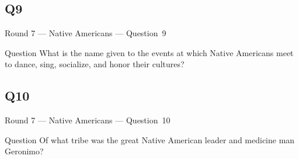 \documentclass[11pt]{beamer}
\begin{document}
\subsection*{Q9}
\begin{frame}[t]{Round 7 --- Native Americans --- \mbox{Question 9}}
\vspace{-0.5em}
\begin{block}{Question}
What is the name given to the events at which Native Americans meet to dance, sing, socialize, and honor their cultures?
\end{block}
\end{frame}
\subsection*{Q10}
\begin{frame}[t]{Round 7 --- Native Americans --- \mbox{Question 10}}
\vspace{-0.5em}
\begin{block}{Question}
Of what tribe was the great Native American leader and medicine man Geronimo?
\end{block}
\end{frame}
\end{document}
